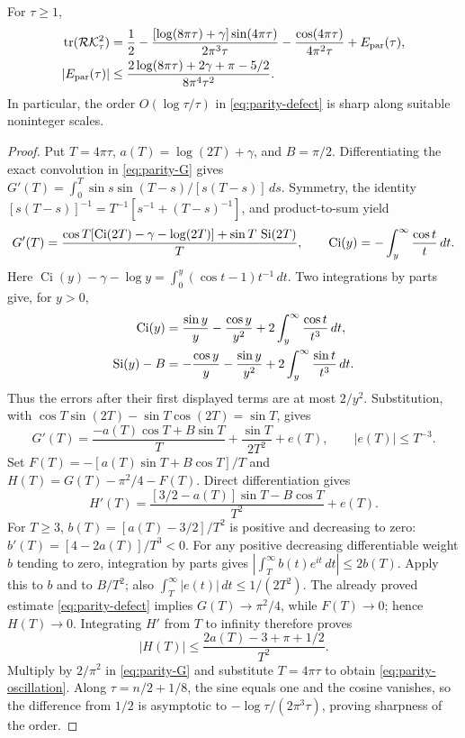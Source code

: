 \begin{corollary}
\label{cor:parity-oscillation}
For $\tau\ge1$,
\begin{equation}\label{eq:parity-oscillation}
\begin{split}
 \operatorname{tr}(\mathcal R\mathcal K_\tau^2)
 &=\frac12-
 \frac{[\log(8\pi\tau)+\gamma]\sin(4\pi\tau)}{2\pi^3\tau}
 -\frac{\cos(4\pi\tau)}{4\pi^2\tau}+E_{\rm par}(\tau),\\
 |E_{\rm par}(\tau)|
 &\le\frac{2\log(8\pi\tau)+2\gamma+\pi-5/2}{8\pi^4\tau^2}.
\end{split}
\end{equation}
In particular, the order $O(\log\tau/\tau)$ in
\eqref{eq:parity-defect} is sharp along suitable noninteger scales.
\end{corollary}
\begin{proof}
Put $T=4\pi\tau$, $a(T)=\log(2T)+\gamma$, and $B=\pi/2$.
Differentiating the exact convolution in \eqref{eq:parity-G} gives
$G'(T)=\int_0^T\sin s\sin(T-s)/[s(T-s)]\,ds$.
Symmetry, the identity
$[s(T-s)]^{-1}=T^{-1}[s^{-1}+(T-s)^{-1}]$, and product-to-sum yield
\[
 G'(T)=\frac{\cos T[\operatorname{Ci}(2T)-\gamma-\log(2T)]
                  +\sin T\,\operatorname{Si}(2T)}{T},
 \qquad
 \operatorname{Ci}(y)=-\int_y^\infty\frac{\cos t}{t}\,dt.
\]
Here $\operatorname{Ci}(y)-\gamma-\log y
=\int_0^y(\cos t-1)t^{-1}\,dt$.
Two integrations by parts give, for $y>0$,
\[
\begin{split}
 \operatorname{Ci}(y)
 &=\frac{\sin y}{y}-\frac{\cos y}{y^2}
                   +2\int_y^\infty\frac{\cos t}{t^3}\,dt,\\
 \operatorname{Si}(y)-B
 &=-\frac{\cos y}{y}-\frac{\sin y}{y^2}
                   +2\int_y^\infty\frac{\sin t}{t^3}\,dt.
\end{split}
\]
Thus the errors after their first displayed terms are at most $2/y^2$.
Substitution, with
$\cos T\sin(2T)-\sin T\cos(2T)=\sin T$, gives
\[
 G'(T)=\frac{-a(T)\cos T+B\sin T}{T}
              +\frac{\sin T}{2T^2}+e(T),
 \qquad |e(T)|\le T^{-3}.
\]
Set $F(T)=-[a(T)\sin T+B\cos T]/T$ and
$H(T)=G(T)-\pi^2/4-F(T)$.  Direct differentiation gives
\[
 H'(T)=\frac{[3/2-a(T)]\sin T-B\cos T}{T^2}+e(T).
\]
For $T\ge3$, $b(T)=[a(T)-3/2]/T^2$ is positive and decreasing to zero:
$b'(T)=[4-2a(T)]/T^3<0$.  For any positive decreasing differentiable
weight $b$ tending to zero, integration by parts gives
$|\int_T^\infty b(t)e^{it}\,dt|\le2b(T)$.
Apply this to $b$ and to $B/T^2$; also
$\int_T^\infty|e(t)|\,dt\le1/(2T^2)$.
The already proved estimate \eqref{eq:parity-defect} implies
$G(T)\to\pi^2/4$, while $F(T)\to0$; hence $H(T)\to0$.
Integrating $H'$ from $T$ to infinity therefore proves
\[
 |H(T)|\le\frac{2a(T)-3+\pi+1/2}{T^2}.
\]
Multiply by $2/\pi^2$ in \eqref{eq:parity-G} and substitute
$T=4\pi\tau$ to obtain \eqref{eq:parity-oscillation}.
Along $\tau=n/2+1/8$, the sine equals one and the cosine vanishes,
so the difference from $1/2$ is asymptotic to
$-\log\tau/(2\pi^3\tau)$, proving sharpness of the order.
\end{proof}

